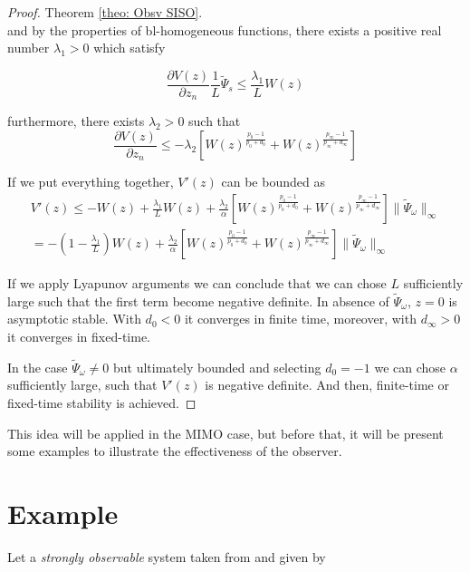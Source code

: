 \documentclass[11pt,letterpaper,twoside,openright]{report}
\providecommand{\norm}[1]{\lVert#1\rVert}
\begin{document}
\begin{proof}{Theorem \ref{theo: Obsv SISO}. \\}
	and by the properties of bl-homogeneous functions, there exists a positive real number $\lambda_1>0$ which satisfy 
	
	\begin{equation}
		\frac{\partial V(z)}{\partial z_{n}} \frac{1}{L} \tilde{\Psi}_s \leq \frac{\lambda_1}{L}W(z)
	\end{equation}
	
	furthermore, there exists $\lambda_2>0$ such that
	\begin{equation}
		\frac{\partial V(z)}{\partial z_{n}} \leq - \lambda_2 \left[ W(z)^{\frac{p_0-1}{p_0+d_0}} +  W(z)^{\frac{p_{\infty}-1}{p_{\infty}+d_{\infty}}} \right]
	\end{equation}

	If we put everything together, $V'(z)$ can be bounded as
	\begin{equation}
		\begin{split}
			V'(z) \leq -W(z) + \frac{\lambda_1}{L}W(z) + \frac{\lambda_2}{\alpha} \left[ W(z)^{\frac{p_0-1}{p_0+d_0}} +  W(z)^{\frac{p_{\infty}-1}{p_{\infty}+d_{\infty}}} \right]\norm{\tilde{\Psi}_{\omega}}_{\infty} \\
			=-\left( 1 - \frac{\lambda_1}{L} \right)W(z) + \frac{\lambda_2}{\alpha} \left[ W(z)^{\frac{p_0-1}{p_0+d_0}} +  W(z)^{\frac{p_{\infty}-1}{p_{\infty}+d_{\infty}}} \right]\norm{\tilde{\Psi}_{\omega}}_{\infty}
		\end{split}
	\end{equation}
	
	If we apply Lyapunov arguments we can conclude that we can chose $L$ sufficiently large such that the first term become negative definite. In absence of $\tilde{\Psi}_{\omega}$, $z=0$ is asymptotic stable. With $d_0<0$ it converges in finite time, moreover, with $d_{\infty}>0$ it converges in fixed-time.
	
	In the case $\tilde{\Psi}_{\omega}\neq 0$ but ultimately bounded and selecting $d_0=-1$ we can chose $\alpha$ sufficiently large, such that $V'(z)$ is negative definite. And then, finite-time or fixed-time stability is achieved. 
\end{proof}

This idea will be applied in the MIMO case, but before that, it will be present some examples to illustrate the effectiveness of the observer.

\section{Example}
Let a \textit{strongly observable} system taken from \cite{Fridman2006} and given by
\end{document}
